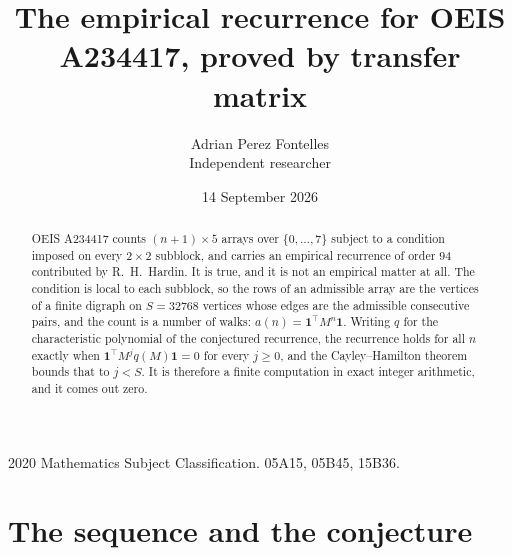 \documentclass[11pt,a4paper]{article}
\title{The empirical recurrence for OEIS A234417, proved by transfer matrix}
\author{Adrian Perez Fontelles\\ \small Independent researcher}
\date{14 September 2026}
\theoremstyle{plain}
\theoremstyle{definition}
\begin{document}
\maketitle

\begin{abstract}
OEIS A234417 counts $(n+1)\times5$ arrays over $\{0,\dots,7\}$ subject to a condition imposed on
every $2\times2$ subblock, and carries an empirical recurrence of order $94$ contributed
by R.~H.~Hardin. It is true, and it is not an empirical matter at all. The condition is local
to each subblock, so the rows of an admissible array are the vertices of a finite digraph
on $S=32768$ vertices whose edges are the admissible consecutive pairs, and the count is a
number of walks: $a(n)=\mathbf{1}^{\!\top}M^{n}\mathbf{1}$. Writing $q$
for the characteristic polynomial of the conjectured recurrence, the recurrence holds for all
$n$ exactly when $\mathbf{1}^{\!\top}M^{j}q(M)\mathbf{1}=0$ for every $j\ge0$, and the
Cayley--Hamilton theorem bounds that to $j<S$. It is therefore a finite computation in exact
integer arithmetic, and it comes out zero.
\end{abstract}

\noindent\small 2020 Mathematics Subject Classification. 05A15, 05B45, 15B36.\normalsize

\section{The sequence and the conjecture}
\end{document}
